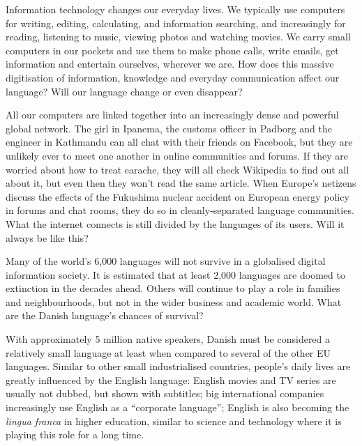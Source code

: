 \begin{multicols}{2}


Information technology changes our everyday lives. We typically use
computers for writing, editing, calculating, and information
searching, and increasingly for reading, listening to music, viewing
photos and watching movies. We carry small computers in our pockets
and use them to make phone calls, write emails, get information and
entertain ourselves, wherever we are. How does this massive
digitisation of information, knowledge and everyday communication
affect our language? Will our language change or even disappear?

All our computers are linked together into an increasingly dense and
powerful global network. The girl in Ipanema, the customs officer in
Padborg and the engineer in Kathmandu can all chat with their friends
on Facebook, but they are unlikely ever to meet one another in online
communities and forums. If they are worried about how to treat
earache, they will all check Wikipedia to find out all about it, but
even then they won't read the same article. When Europe's netizens
discuss the effects of the Fukushima nuclear accident on European
energy policy in forums and chat rooms, they do so in
cleanly-separated language communities. What the internet connects is
still divided by the languages of its users. Will it always be like
this?

Many of the world's 6,000 languages will not survive in a globalised
digital information society. It is estimated that at least 2,000
languages are doomed to extinction in the decades ahead. Others will
continue to play a role in families and neighbourhoods, but not in the
wider business and academic world. What are the Danish language's
chances of survival?

With approximately 5 million native speakers, Danish must be
considered a relatively small language at least when compared to
several of the other EU languages. Similar to other small
industrialised countries, people's daily lives are greatly influenced
by the English language: English movies and TV series are usually not
dubbed, but shown with subtitles; big international companies
increasingly use English as a ``corporate language''; English is
also becoming the {\it lingua franca} in higher education, similar to
science and technology where it is playing this role for a long time.


\end{multicols}
